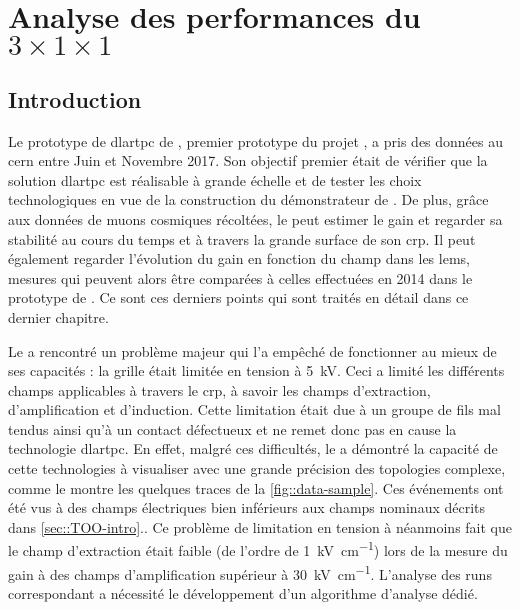 \chapter{Analyse des performances du \texorpdfstring{$3\times 1\times 1$}{3x1x1}}\label{chap::5}
    
  \section{Introduction}
    Le prototype de \gls{dlartpc} de \TOO{}, premier prototype du projet \protodp{}, a pris des données au \gls{cern} entre Juin et Novembre 2017. Son objectif premier était de vérifier que la solution \gls{dlartpc} est réalisable à grande échelle et de tester les choix technologiques en vue de la construction du démonstrateur de \SSS{}. De plus, grâce aux données de muons cosmiques récoltées, le \TOO{} peut estimer le gain et regarder sa stabilité au cours du temps et à travers la grande surface de son \gls{crp}. Il peut également regarder l'évolution du gain en fonction du champ dans les \glspl{lem}, mesures qui peuvent alors être comparées à celles effectuées en 2014 dans le prototype de \threeL\cite{Cantini2014}. Ce sont ces derniers points qui sont traités en détail dans ce dernier chapitre.

    Le \TOO{} a rencontré un problème majeur qui l'a empêché de fonctionner au mieux de ses capacités : la grille était limitée en tension à \SI{5}{\kilo\volt}. Ceci a limité les différents champs applicables à travers le \gls{crp}, à savoir les champs d'extraction, d'amplification et d'induction. Cette limitation était due à un groupe de fils mal tendus ainsi qu'à un contact défectueux et ne remet donc pas en cause la technologie \gls{dlartpc}. En effet, malgré ces difficultés, le \TOO{} a démontré la capacité de cette technologies à visualiser avec une grande précision des topologies complexe, comme le montre les quelques traces de la \autoref{fig::data-sample}. Ces événements ont été vus à des champs électriques bien inférieurs aux champs nominaux décrits dans \autoref{sec::TOO-intro}.. Ce problème de limitation en tension à néanmoins fait que le champ d'extraction était faible (de l'ordre de \SI{1}{\kilo\volt\per\centi\meter}) lors de la mesure du gain à des champs d'amplification supérieur à \SI{30}{\kilo\volt\per\centi\meter}. L'analyse des runs correspondant a nécessité le développement d'un algorithme d'analyse dédié.

